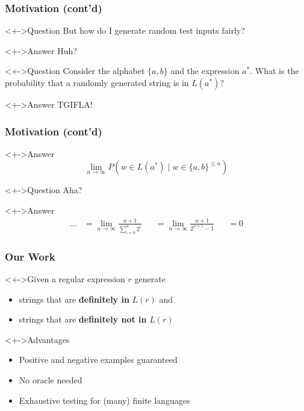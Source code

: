 \documentclass[pdftex,aspectratio=169]{beamer}
\begin{document}
\begin{frame}
  \frametitle{Motivation (cont'd)}
  \begin{block}<+->{Question}
    But how do I generate random test inputs fairly?
  \end{block}
  \begin{exampleblock}<+->{Answer}
    Huh?
  \end{exampleblock}
  \begin{block}<+->{Question}
    Consider the alphabet $\{a,b\}$ and the expression $a^*$. What is
    the probability that a randomly generated string is in $L (a^*)$?
  \end{block}
  \begin{exampleblock}<+->{Answer}
    TGIFLA!
  \end{exampleblock}
\end{frame}
\begin{frame}
  \frametitle{Motivation (cont'd)}
  \begin{exampleblock}<+->{Answer}
    \begin{displaymath}
      \lim_{n\to\infty} P (w \in L(a^*) \mid w \in \{a,b\}^{\le n})
    \end{displaymath}
  \end{exampleblock}
  \begin{block}<+->{Question}
    Aha?
  \end{block}
  \begin{exampleblock}<+->{Answer}
    \vspace{-\baselineskip}
    \begin{align*}
      \dots&= \lim_{n\to\infty} \frac{n+1}{\sum_{i=0}^n 2^i } &
      &= \lim_{n\to\infty} \frac{n+1}{ 2^{n+1} -1 }  &
      &=0
    \end{align*}
  \end{exampleblock}
\end{frame}
\begin{frame}
  \frametitle{Our Work}
  \begin{block}<+->{Given a regular expression $r$ generate}
    \begin{itemize}
    \item strings that are \textbf{definitely in} $L(r)$ and
    \item strings that are \textbf{definitely not in} $L(r)$
    \end{itemize}
  \end{block}
  \begin{block}<+->{Advantages}
    \begin{itemize}
    \item Positive and negative examples guaranteed 
    \item No oracle needed
    \item Exhaustive testing for (many) finite languages
    \end{itemize}
  \end{block}
\end{frame}
\end{document}
